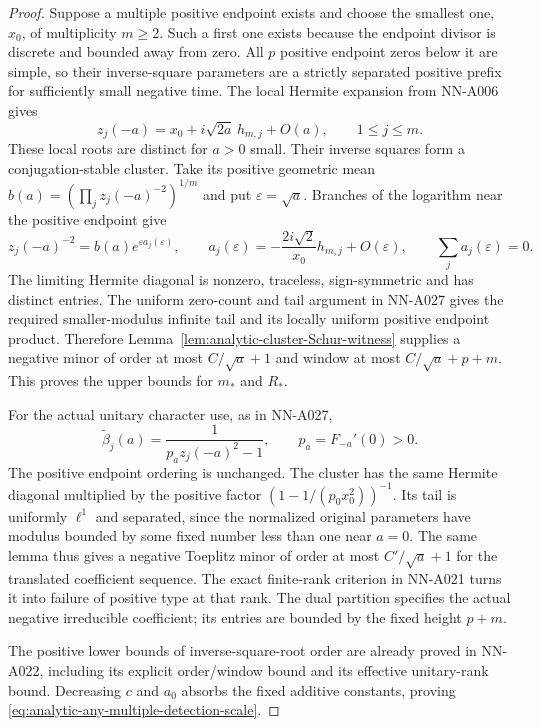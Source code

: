 \begin{proof}
Suppose a multiple positive endpoint exists and choose the smallest
one, $x_0$, of multiplicity $m\ge2$. Such a first one exists because
the endpoint divisor is discrete and bounded away from zero. All
$p$ positive endpoint zeros below it are simple, so their inverse-square
parameters are a strictly separated positive prefix for sufficiently
small negative time. The local Hermite expansion from NN-A006 gives
\[
             z_j(-a)=x_0+i\sqrt{2a}\,h_{m,j}+O(a),
                             \qquad 1\le j\le m.
\]
These local roots are distinct for $a>0$ small. Their inverse squares
form a conjugation-stable cluster. Take its positive geometric mean
$b(a)=(\prod_j z_j(-a)^{-2})^{1/m}$ and put $\varepsilon=\sqrt a$.
Branches of the logarithm near the positive endpoint give
\[
 z_j(-a)^{-2}=b(a)e^{\varepsilon a_j(\varepsilon)},\qquad
 a_j(\varepsilon)=-\frac{2i\sqrt2}{x_0}h_{m,j}+O(\varepsilon),
                         \qquad\sum_j a_j(\varepsilon)=0.
\]
The limiting Hermite diagonal is nonzero, traceless, sign-symmetric
and has distinct entries. The uniform zero-count and tail argument
in NN-A027 gives the required smaller-modulus infinite tail and its
locally uniform positive endpoint product. Therefore
Lemma~\ref{lem:analytic-cluster-Schur-witness} supplies a negative
minor of order at most $C/\sqrt a+1$ and window at most
$C/\sqrt a+p+m$. This proves the upper bounds for $m_*$ and $R_*$.

For the actual unitary character use, as in NN-A027,
\[
       \widetilde\beta_j(a)=\frac1{p_a z_j(-a)^2-1},
                             \qquad p_a=F_{-a}'(0)>0.
\]
The positive endpoint ordering is unchanged. The cluster has the
same Hermite diagonal multiplied by the positive factor
$(1-1/(p_0x_0^2))^{-1}$. Its tail is uniformly $\ell^1$ and separated,
since the normalized original parameters have modulus bounded by
some fixed number less than one near $a=0$. The same lemma thus
gives a negative Toeplitz minor of order at most $C'/\sqrt a+1$
for the translated coefficient sequence. The exact finite-rank
criterion in NN-A021 turns it into failure of positive type at that
rank. The dual partition specifies the actual negative irreducible
coefficient; its entries are bounded by the fixed height $p+m$.

The positive lower bounds of inverse-square-root order are already
proved in NN-A022, including its explicit order/window bound and
its effective unitary-rank bound. Decreasing $c$ and $a_0$ absorbs
the fixed additive constants, proving
\eqref{eq:analytic-any-multiple-detection-scale}.


\end{proof}
